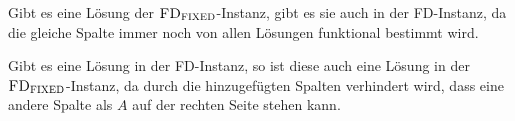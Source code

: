 Gibt es eine Lösung der $\textsc{FD}_{\textsc{FIXED}}$-Instanz, gibt es sie auch in der \textsc{FD}-Instanz, da die gleiche Spalte immer noch von allen Lösungen funktional bestimmt wird.

Gibt es eine Lösung in der \textsc{FD}-Instanz, so ist diese auch eine Lösung in der $\textsc{FD}_{\textsc{FIXED}}$-Instanz, da durch die hinzugefügten Spalten verhindert wird, dass eine andere Spalte als $A$ auf der rechten Seite stehen kann.




